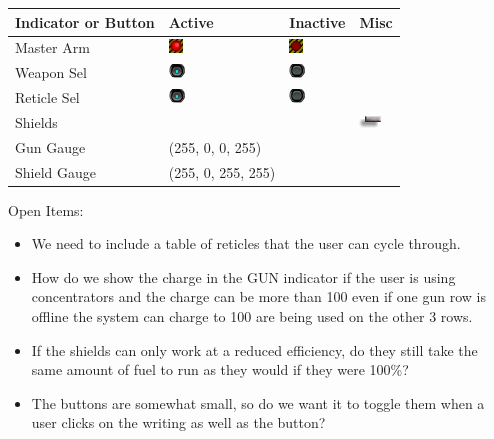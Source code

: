 \begin{tabular}{ | l | l | l | l | }
\hline
Indicator or Button & Active & Inactive & Misc\\
\hline
Master Arm & \includegraphics{images/button_danger_on.png} & \includegraphics{images/button_danger_off.png} & \\
Weapon Sel & \includegraphics{images/button_on.png} & \includegraphics{images/button_off.png} & \\
Reticle Sel & \includegraphics{images/button_on.png} & \includegraphics{images/button_off.png} & \\
Shields & & & \includegraphics{images/slider.png} \\
Gun Gauge & (255, 0, 0, 255) & & \\
Shield Gauge & (255, 0, 255, 255) & & \\
\hline
\end{tabular}

Open Items:
\begin{itemize}
\item We need to include a table of reticles that the user can cycle through.
\item How do we show the charge in the GUN indicator if the user is
using concentrators and the charge can be more than 100%
even if one gun row is offline the system can charge to 100%
are being used on the other 3 rows.
\item If the shields can only work at a reduced efficiency, do they still
take the same amount of fuel to run as they would if they were 100\%?
\item The buttons are somewhat small, so do we want it to toggle them
when a user clicks on the writing as well as the button?
\end{itemize}

